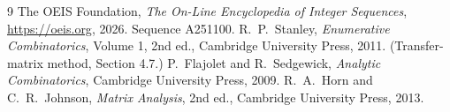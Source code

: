 \documentclass[11pt,a4paper]{article}
\theoremstyle{plain}
\theoremstyle{definition}
\begin{document}
\begin{thebibliography}{9}
 The OEIS Foundation, \emph{The On-Line Encyclopedia of Integer
Sequences}, \url{https://oeis.org}, 2026. Sequence A251100.
 R.~P.~Stanley, \emph{Enumerative Combinatorics}, Volume 1, 2nd ed.,
Cambridge University Press, 2011. (Transfer-matrix method, Section 4.7.)
 P.~Flajolet and R.~Sedgewick, \emph{Analytic Combinatorics}, Cambridge
University Press, 2009.
 R.~A.~Horn and C.~R.~Johnson, \emph{Matrix Analysis}, 2nd ed., Cambridge
University Press, 2013.
\end{thebibliography}
\end{document}
